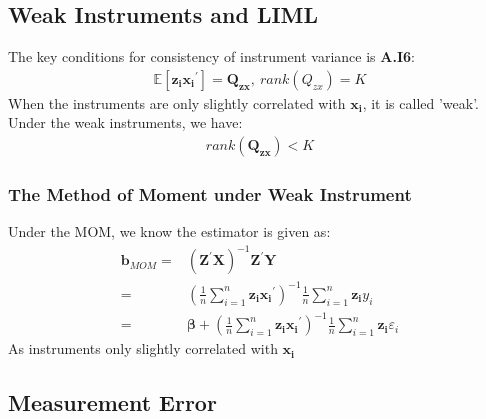 \documentclass{article}
\begin{document}
\subsection{Weak Instruments and LIML}
The key conditions for consistency of instrument variance is \textbf{A.I6}:
	\begin{align*}
		\mathbb{E}[\boldsymbol{z_i}\boldsymbol{x_i}^\prime] = \boldsymbol{Q_{zx}},\ rank(Q_{zx}) = K 
	\end{align*}
When the instruments are only slightly correlated with $\boldsymbol{x_i}$, it is called 'weak'. Under the weak instruments, we have:
	\begin{align*}
		rank(\boldsymbol{Q_{zx}}) < K
	\end{align*}
	
\subsubsection{The Method of Moment under Weak Instrument}
Under the MOM, we know the estimator is given as:
	\begin{align*}
		\boldsymbol{b}_{MOM} = &(\boldsymbol{Z}^\prime \boldsymbol{X})^{-1} \boldsymbol{Z}^\prime \boldsymbol{Y}\\ = &
		\left( \frac{1}{n} \sum^n_{i=1} \boldsymbol{z_i} \boldsymbol{x_i}^\prime \right)^{-1} \frac{1}{n} \sum^n_{i=1} \boldsymbol{z_i}y_i\\ = &
		\boldsymbol{\beta} + \left( \frac{1}{n} \sum^n_{i=1} \boldsymbol{z_i} \boldsymbol{x_i}^\prime \right)^{-1} \frac{1}{n} \sum^n_{i=1} \boldsymbol{z_i}\varepsilon_i
	\end{align*}
As instruments only slightly correlated with $\boldsymbol{x_i}$


\subsection{Measurement Error}
\end{document}
